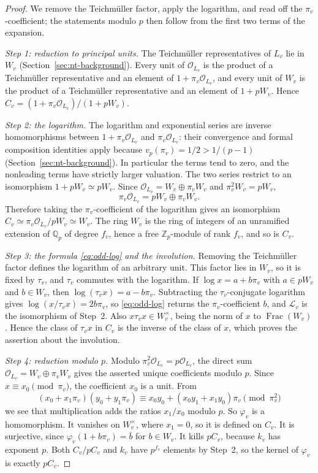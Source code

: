 \documentclass[11pt]{article}
\theoremstyle{plain}
\theoremstyle{definition}
\theoremstyle{remark}
\DeclareMathOperator{\Frac}{Frac}
\newcommand{\Z}{\mathbb Z}
\newcommand{\Q}{\mathbb Q}
\newcommand{\OO}{\mathcal O}
\begin{document}
\begin{proof}
We remove the Teichm\"uller factor, apply the logarithm, and read off
the $\pi_v$-coefficient; the statements modulo $p$ then follow from the
first two terms of the expansion.

\emph{Step 1: reduction to principal units.}  The Teichm\"uller
representatives of $L_v$ lie in $W_v$ (Section~\ref{sec:nt-background}).
Every unit of $\OO_{L_v}$ is the product of a Teichm\"uller
representative and an element of $1+\pi_v\OO_{L_v}$, and every unit of
$W_v$ is the product of a Teichm\"uller representative and an element of
$1+pW_v$.  Hence
$C_v=(1+\pi_v\OO_{L_v})/(1+pW_v)$.

\emph{Step 2: the logarithm.}  The logarithm and exponential series are
inverse homomorphisms between $1+\pi_v\OO_{L_v}$ and $\pi_v\OO_{L_v}$:
their convergence and formal composition identities apply because
$v_p(\pi_v)=1/2>1/(p-1)$ (Section~\ref{sec:nt-background}).  In
particular the terms tend to zero, and the nonleading terms have strictly
larger valuation.  The two series restrict to an isomorphism
$1+pW_v\simeq pW_v$.  Since $\OO_{L_v}=W_v\oplus\pi_vW_v$ and
$\pi_v^2W_v=pW_v$,
\[
 \pi_v\OO_{L_v}=pW_v\oplus\pi_vW_v .
\]
Therefore taking the $\pi_v$-coefficient of the logarithm gives an
isomorphism $C_v\simeq\pi_v\OO_{L_v}/pW_v\simeq W_v$.  The ring $W_v$ is
the ring of integers of an unramified extension of $\Q_p$ of degree
$f_v$, hence a free $\Z_p$-module of rank $f_v$, and so is $C_v$.

\emph{Step 3: the formula \eqref{eq:odd-log} and the involution.}
Removing the Teichm\"uller factor defines the logarithm of an arbitrary
unit.  This factor lies in $W_v$, so it is fixed by $\tau_v$, and $\tau_v$
commutes with the logarithm.  If $\log x=a+b\pi_v$ with $a\in pW_v$ and
$b\in W_v$, then $\log(\tau_vx)=a-b\pi_v$.  Subtracting the
$\tau_v$-conjugate logarithm gives $\log(x/\tau_vx)=2b\pi_v$, so
\eqref{eq:odd-log} returns the $\pi_v$-coefficient $b$, and
$\mathcal L_v$ is the isomorphism of Step~2.  Also
$x\tau_vx\in W_v^\times$, being the norm of $x$ to $\Frac(W_v)$.  Hence
the class of $\tau_vx$ in $C_v$ is the inverse of the class of $x$, which
proves the assertion about the involution.

\emph{Step 4: reduction modulo $p$.}  Modulo
$\pi_v^2\OO_{L_v}=p\OO_{L_v}$, the direct sum
$\OO_{L_v}=W_v\oplus\pi_vW_v$ gives the asserted unique coefficients
modulo $p$.  Since $x\equiv x_0\pmod{\pi_v}$, the coefficient $x_0$ is a
unit.  From
\[
 (x_0+x_1\pi_v)(y_0+y_1\pi_v)\equiv x_0y_0+(x_0y_1+x_1y_0)\pi_v
 \pmod{\pi_v^2}
\]
we see that multiplication adds the ratios $x_1/x_0$ modulo $p$.  So
$\varphi_v$ is a homomorphism.  It vanishes on $W_v^\times$, where
$x_1=0$, so it is defined on $C_v$.  It is surjective, since
$\varphi_v(1+b\pi_v)=\bar b$ for $b\in W_v$.  It kills $pC_v$, because
$k_v$ has exponent $p$.  Both $C_v/pC_v$ and $k_v$ have $p^{f_v}$
elements by Step~2, so the kernel of $\varphi_v$ is exactly $pC_v$.


\end{proof}
\end{document}
